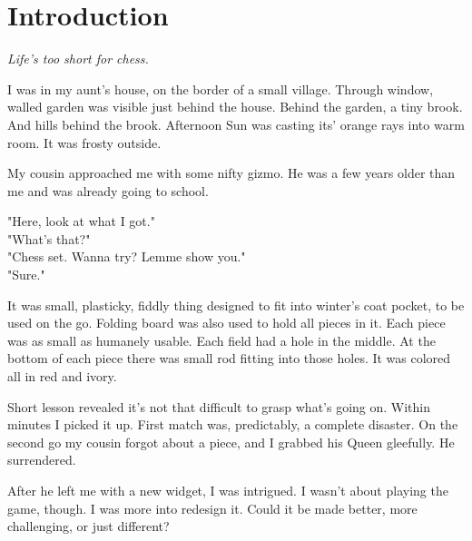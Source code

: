 

\chapter*{Introduction}

\begin{flushright}
\parbox{0.6\textwidth}{
\emph{Life's too short for chess. \\
 } }
\end{flushright}

\noindent
I was in my aunt's house, on the border of a small village.
Through window, walled garden was visible just behind the house.
Behind the garden, a tiny brook. And hills behind the brook.
Afternoon Sun was casting its' orange rays into warm room. It
was frosty outside.

My cousin approached me with some nifty gizmo. He was a
few years older than me and was already going to school.

\noindent
"Here, look at what I got." \\
\hspace*{\fill}"What's that?" \\
"Chess set. Wanna try? Lemme show you." \\
\hspace*{\fill}"Sure."

It was small, plasticky, fiddly thing designed to fit into winter's
coat pocket, to be used on the go. Folding board was also used to
hold all pieces in it. Each piece was as small as humanely usable.
Each field had a hole in the middle. At the bottom of each piece
there was small rod fitting into those holes. It was colored all
in red and ivory.

Short lesson revealed it's not that difficult to grasp what's going
on. Within minutes I picked it up. First match was, predictably, a
complete disaster. On the second go my cousin forgot about a piece,
and I grabbed his Queen gleefully. He surrendered.

After he left me with a new widget, I was intrigued. I wasn't
about playing the game, though. I was more into redesign it. Could it
be made better, more challenging, or just different?

